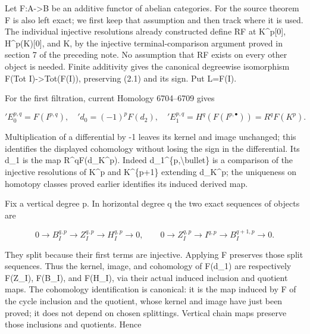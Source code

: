\documentclass[11pt]{article}
\begin{document}
Let F:\allowbreak{}A\allowbreak{}->B be an additive functor of abelian categories. For the source theorem F is also left exact; we first keep that assumption and then track where it is used. The individual injective resolutions already constructed define RF at K\textasciicircum{}p[0]\allowbreak{},\allowbreak{} H\textasciicircum{}p(K)\allowbreak{}[0]\allowbreak{},\allowbreak{} and K,\allowbreak{} by the injective terminal-comparison argument proved in section 7 of the preceding note. No assumption that RF exists on every other object is needed. Finite additivity gives the canonical degreewise isomorphism F(Tot I)\allowbreak{}\allowbreak{}->Tot(F(I)\allowbreak{})\allowbreak{},\allowbreak{} preserving (2.1)\allowbreak{} and its sign. Put L\allowbreak{}=F(I)\allowbreak{}.

For the first filtration,\allowbreak{} current Homology 6704–\allowbreak{}6709 gives

\[
 {}'E_0^{p,q}=F(I^{p,q}),\quad {}'d_0=(-1)^p F(d_2),\quad
 {}'E_1^{p,q}=H^q(F(I^{p,\bullet}))=R^qF(K^p).                  \tag{2.2}
\]

Multiplication of a differential by -1 leaves its kernel and image unchanged; this identifies the displayed cohomology without losing the sign in the differential. Its d\_\allowbreak{}1 is the map R\textasciicircum{}qF(d\_\allowbreak{}K\textasciicircum{}p)\allowbreak{}. Indeed d\_\allowbreak{}1\textasciicircum{}\{p,\allowbreak{}\textbackslash{}bullet\} is a comparison of the injective resolutions of K\^{}p and K\textasciicircum{}\{p\allowbreak{}+1\} extending d\_\allowbreak{}K\textasciicircum{}p; the uniqueness on homotopy classes proved earlier identifies its induced derived map.

Fix a vertical degree p. In horizontal degree q the two exact sequences of objects are

\[
 0\to B_I^{q,p}\to Z_I^{q,p}\to H_I^{q,p}\to0,\qquad
 0\to Z_I^{q,p}\to I^{q,p}\to B_I^{q+1,p}\to0.                 \tag{2.3}
\]

They split because their first terms are injective. Applying F preserves those split sequences. Thus the kernel,\allowbreak{} image,\allowbreak{} and cohomology of F(d\_\allowbreak{}1)\allowbreak{} are respectively F(Z\_\allowbreak{}I)\allowbreak{},\allowbreak{} F(B\_\allowbreak{}I)\allowbreak{},\allowbreak{} and F(H\_\allowbreak{}I)\allowbreak{},\allowbreak{} via their actual induced inclusion and quotient maps. The cohomology identification is canonical:\allowbreak{} it is the map induced by F of the cycle inclusion and the quotient,\allowbreak{} whose kernel and image have just been proved; it does not depend on chosen splittings. Vertical chain maps preserve those inclusions and quotients. Hence
\end{document}
